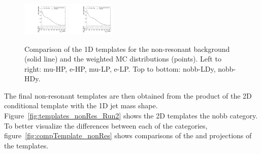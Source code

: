 \begin{figure}[htbp]
  \includegraphics[width=0.2\textwidth]{fig/2Dfit/templateVsReco_nonRes_r0_MJ_mu_LP_nobb_HDy.pdf}
  \includegraphics[width=0.2\textwidth]{fig/2Dfit/templateVsReco_nonRes_r0_MJ_e_LP_nobb_HDy.pdf}\\
  \caption{
    Comparison of the 1D \MJ templates for the non-resonant background (solid line) and the weighted MC distributions (points).
    Left to right: mu-HP, e-HP, mu-LP, e-LP.
    Top to bottom: nobb-LDy, nobb-HDy.
  }
  \label{fig:1dtemplateVsReco_nonRes_MJ_Run2}
\end{figure}

The final non-resonant templates are then obtained from the product of the 2D conditional template with the 1D jet mass shape.
Figure~\ref{fig:templates_nonRes_Run2} shows the 2D templates the nobb category.
To better visualize the differences between each of the categories, figure~\ref{fig:compTemplate_nonRes} shows comparisons of the \MVV and \MJ projections of the templates.

